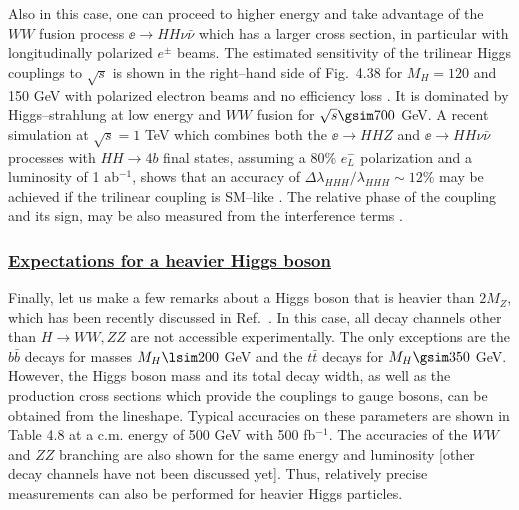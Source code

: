 Also in this case, one can proceed to higher energy and take advantage of the
$WW$ fusion process $\ee\to HH \nu \bar \nu$ \cite{Yamashita,Yamashita0} which
has a larger cross section, in particular with longitudinally polarized $e^\pm$
beams. The estimated sensitivity of the trilinear Higgs couplings to $\sqrt{s}$
is shown in the right--hand side of Fig.~4.38 for $M_H=120$ and 150 GeV with
polarized electron beams and no efficiency loss \cite{Yamashita}. It is
dominated by Higgs--strahlung at low energy and $WW$ fusion for $\sqrt{s} \gsim
700$ GeV. A recent simulation at $\sqrt{s}=1$ TeV which combines both the $\ee
\to HHZ$ and $\ee \to HH\nu \bar \nu$ processes with  $HH\to 4b$ final states,
assuming a 80\% $e^-_L$ polarization and a luminosity of 1 ab$^{-1}$, shows
that an accuracy of $\Delta \lambda_{HHH}/\lambda_{HHH} \sim 12\%$ may be
achieved if the trilinear coupling is SM--like \cite{Yamashita}. The relative
phase of the coupling and its sign, may be also measured from the interference
terms \cite{LCWS,Yamashita}. \\ 

\centerline{ 
}
\vspace*{.mm}

\vspace*{-2mm}
\subsubsection*{\underline{Expectations for a heavier Higgs boson}}

Finally, let us make a few remarks about a Higgs boson that is heavier than
$2M_Z$, which has been recently discussed in Ref.~\cite{ee-H-heavy}. In this
case, all decay channels other than $H \to WW,ZZ$ are not accessible
experimentally. The only exceptions are the $b\bar b$ decays for masses $M_H
\lsim 200$ GeV and the $t\bar t$ decays for $M_H \gsim 350$ GeV. However, the
Higgs boson mass and its total decay width, as well as the production cross
sections which provide the couplings to gauge bosons, can be obtained from the
lineshape. Typical accuracies on these parameters are shown in Table  4.8 at a
c.m. energy of 500 GeV with 500 fb$^{-1}$. The accuracies of the $WW$ and $ZZ$
branching are also shown for the same energy and luminosity
[other decay channels have not been discussed yet]. Thus, relatively
precise measurements can also be performed for heavier Higgs particles.


